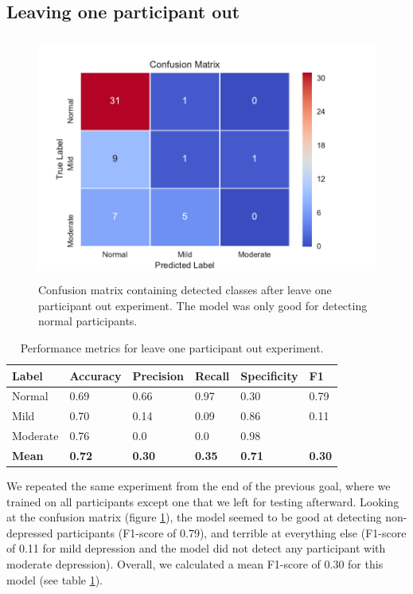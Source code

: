 \subsection{Leaving one participant out}

\begin{figure}[h]
\begin{center}
      \includegraphics[height=8cm]{img/depression_class/leave_one_out.pdf}
      \caption{Confusion matrix containing detected classes after leave one participant out experiment. The model was only good for detecting normal participants.}
      \label{figure:depression_class_conf_loo}
\end{center}
\end{figure}

\begin{table}[h]
\begin{center}
      \begin{tabular}{|l|l|l|l|l|l|}
            \hline
            \bfseries Label & \bfseries Accuracy & \bfseries Precision & \bfseries Recall & \bfseries Specificity & \bfseries F1 \\\hline
            Normal & 0.69 & 0.66 & 0.97 & 0.30 & 0.79 \\\hline
            Mild & 0.70 & 0.14 & 0.09 & 0.86 & 0.11 \\\hline
            Moderate & 0.76 & 0.0 & 0.0 & 0.98 &  \\\hline
            \bfseries Mean & \bfseries 0.72 & \bfseries 0.30 & \bfseries 0.35 & \bfseries 0.71 & \bfseries 0.30 \\\hline
      \end{tabular}
      \caption{Performance metrics for leave one participant out experiment.}
      \label{table:depression_class_performance_loo}
\end{center}
\end{table}
We repeated the same experiment from the end of the previous goal, where we trained on all participants except one that we left for testing afterward. Looking at the confusion matrix (figure \ref{figure:depression_class_conf_loo}), the model seemed to be good at detecting non-depressed participants (F1-score of 0.79), and terrible at everything else (F1-score of 0.11 for mild depression and the model did not detect any participant with moderate depression). Overall, we calculated a mean F1-score of 0.30 for this model (see table \ref{table:depression_class_performance_loo}). 


